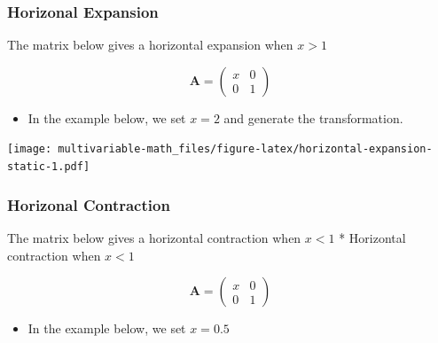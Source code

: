 \documentclass[
]{book}
\newenvironment{Shaded}{\begin{snugshade}}{\end{snugshade}}
\newcommand{\DecValTok}[1]{\textcolor[rgb]{0.00,0.00,0.81}{#1}}
\newcommand{\KeywordTok}[1]{\textcolor[rgb]{0.13,0.29,0.53}{\textbf{#1}}}
\newcommand{\NormalTok}[1]{#1}
\newcommand{\OperatorTok}[1]{\textcolor[rgb]{0.81,0.36,0.00}{\textbf{#1}}}
\newcommand{\StringTok}[1]{\textcolor[rgb]{0.31,0.60,0.02}{#1}}
\providecommand{\tightlist}{%
  \setlength{\itemsep}{0pt}\setlength{\parskip}{0pt}}
\theoremstyle{definition}
\theoremstyle{definition}
\theoremstyle{definition}
\theoremstyle{remark}
\begin{document}
\hypertarget{horizonal-expansion}{%
\subsubsection{Horizonal Expansion}\label{horizonal-expansion}}

The matrix below gives a horizontal expansion when \(x > 1\)

\[
\mathbf{A} = \begin{pmatrix}
x & 0 \\
0 & 1
\end{pmatrix}
\]

\begin{itemize}
\tightlist
\item
  In the example below, we set \(x = 2\) and generate the transformation.
\end{itemize}

\begin{Shaded}
\end{Shaded}

\texttt{[image: multivariable-math\_files/figure-latex/horizontal-expansion-static-1.pdf]}

\hypertarget{horizonal-contraction}{%
\subsubsection{Horizonal Contraction}\label{horizonal-contraction}}

The matrix below gives a horizontal contraction when \(x < 1\)
* Horizontal contraction when \(x < 1\)

\[
\mathbf{A} = \begin{pmatrix}
x & 0 \\
0 & 1
\end{pmatrix}
\]

\begin{itemize}
\tightlist
\item
  In the example below, we set \(x = 0.5\)
\end{itemize}
\end{document}
